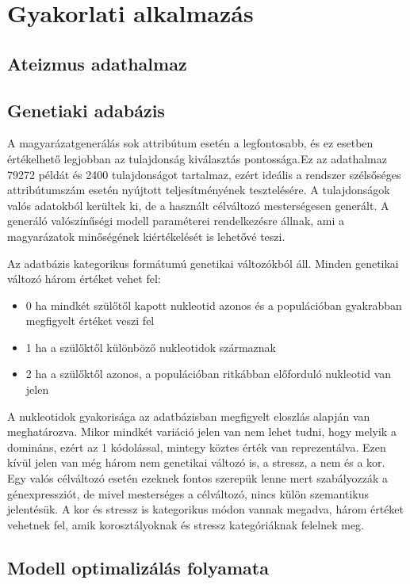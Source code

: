\chapter{Gyakorlati alkalmazás}\label{ch:example}
\section{Ateizmus adathalmaz}



\section{Genetiaki adabázis}

A magyarázatgenerálás sok attribútum esetén a legfontosabb, és ez esetben értékelhető legjobban az tulajdonság kiválasztás pontossága.Ez az adathalmaz 79272 példát és 2400 tulajdonságot tartalmaz, ezért ideális a rendszer szélsőséges attribútumszám esetén nyújtott teljesítményének tesztelésére. A tulajdonságok valós adatokból kerültek ki, de a használt célváltozó mesterségesen generált. A generáló valószínűségi modell paraméterei rendelkezésre állnak, ami a magyarázatok minőségének kiértékelését is lehetővé teszi.

Az adatbázis kategorikus formátumú genetikai változókból áll. Minden genetikai változó három értéket vehet fel:
\begin{itemize}
	\item  0 ha mindkét szülőtől kapott nukleotid azonos és a populációban gyakrabban megfigyelt értéket veszi fel
	\item 1 ha a szülőktől különböző nukleotidok származnak
	\item 2 ha a szülőktől azonos, a populációban ritkábban előforduló nukleotid van jelen
\end{itemize}
A nukleotidok gyakorisága az adatbázisban megfigyelt eloszlás alapján van meghatározva. Mikor mindkét variáció jelen van nem lehet tudni, hogy melyik a domináns, ezért az 1 kódolással, mintegy köztes érték van reprezentálva. Ezen kívül jelen van még három nem genetikai változó is, a stressz, a nem és a kor. Egy valós célváltozó esetén ezeknek fontos szerepük lenne mert szabályozzák a génexpressziót, de mivel mesterséges a célváltozó, nincs külön szemantikus jelentésük. A kor és stressz is kategorikus módon vannak megadva, három értéket vehetnek fel, amik korosztályoknak és stressz kategóriáknak felelnek meg.
	
\section{Modell optimalizálás folyamata}

